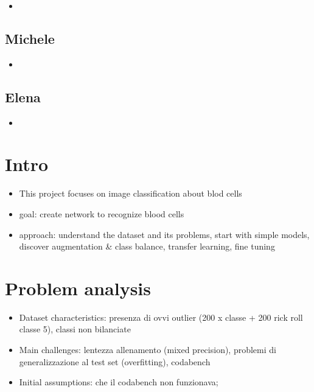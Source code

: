 \documentclass[11pt]{article}
\begin{document}
\begin{multicols*}{2}
        \begin{itemize}
            \item 
        \end{itemize}

        \subsection{Michele}

        \begin{itemize}
            \item 
        \end{itemize}

        \subsection{Elena}

        \begin{itemize}
            \item 
        \end{itemize}

        \newpage

        \section{Intro}
    
        \begin{itemize}
            \item This project focuses on image classification about blod cells
            \item goal: create network to recognize blood cells
            \item approach: understand the dataset and its problems, start with simple models, discover augmentation \& class balance, transfer learning, fine tuning
        \end{itemize}
    
        \section{Problem analysis} 
    
        \begin{itemize}
            \item Dataset characteristics: presenza di ovvi outlier (200 x classe + 200 rick roll classe 5), classi non bilanciate
            \item Main challenges: lentezza allenamento (mixed precision), problemi di generalizzazione al test set (overfitting), codabench
            \item Initial assumptions: che il codabench non funzionava; 
        \end{itemize}


\end{multicols*}
\end{document}
